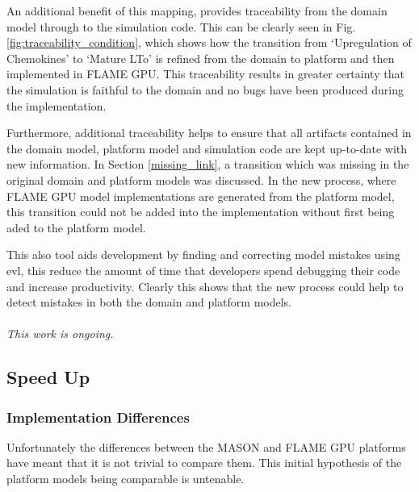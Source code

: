 \documentclass{UoYCSproject}
\begin{document}
An additional benefit of this mapping, provides traceability from the domain model through to the simulation code.
This can be clearly seen in Fig. \ref{fig:traceability_condition}, which shows how the transition from `Upregulation of Chemokines' to `Mature \gls{LTo}' is refined from the \gls{domain} to \gls{platform} and then implemented in \gls{FLAME GPU}.
This traceability results in greater certainty that the simulation is faithful to the domain and no bugs have been produced during the implementation.

Furthermore, additional traceability helps to ensure that all artifacts contained in the domain model, platform model and simulation code are kept up-to-date with new information.
In Section \ref{missing_link}, a transition which was missing in the original domain and platform models was discussed.
In the new process, where \gls{FLAME GPU} model implementations are generated from the platform model, this transition could not be added into the implementation without first being aded to the platform model.

This also tool aids development by finding and correcting model mistakes using \gls{evl}, this reduce the amount of time that developers spend debugging their code and increase productivity.
Clearly this shows that the new process could help to detect mistakes in both the domain and platform models.
\\\\
\textit{This work is ongoing.}

\subsection{Speed Up}
\subsubsection{Implementation Differences}
Unfortunately the differences between the \gls{MASON} and \gls{FLAME GPU} platforms have meant that it is not trivial to compare them.
This initial hypothesis of the platform models being comparable is untenable.



\end{document}
